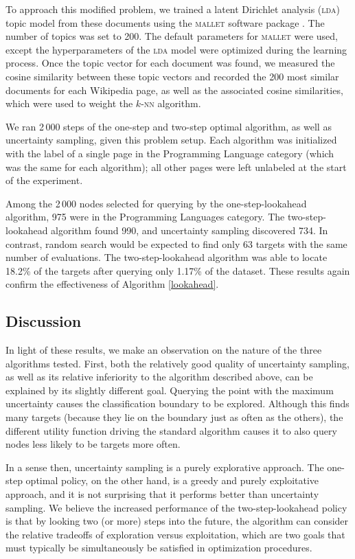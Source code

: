 \documentclass{article}
\begin{document}
To approach this modified problem, we trained a latent Dirichlet
analysis (\textsc{lda}) topic model from these documents using the
\textsc{mallet} software package \citep{mallet}. The number of topics
was set to 200.  The default parameters for \textsc{mallet} were used,
except the hyperparameters of the \textsc{lda} model were optimized
during the learning process.  Once the topic vector for each document
was found, we measured the cosine similarity between these topic
vectors and recorded the 200 most similar documents for each Wikipedia
page, as well as the associated cosine similarities, which were used
to weight the $k$-\textsc{nn} algorithm.

We ran 2\,000 steps of the one-step and two-step optimal algorithm, as
well as uncertainty sampling, given this problem setup. Each algorithm
was initialized with the label of a single page in the Programming
Language category (which was the same for each algorithm); all other
pages were left unlabeled at the start of the experiment.

Among the 2\,000 nodes selected for querying by the one-step-lookahead
algorithm, 975 were in the Programming Languages category.  The
two-step-lookahead algorithm found 990, and uncertainty sampling
discovered 734. In contrast, random search would be expected to find
only 63 targets with the same number of evaluations.  The
two-step-lookahead algorithm was able to locate 18.2\% of the targets
after querying only 1.17\% of the dataset.  These results again
confirm the effectiveness of Algorithm \ref{lookahead}.

\subsection{Discussion}

In light of these results, we make an observation on the nature of the
three algorithms tested.  First, both the relatively good quality of
uncertainty sampling, as well as its relative inferiority to the
algorithm described above, can be explained by its slightly different
goal.  Querying the point with the maximum uncertainty causes the
classification boundary to be explored.  Although this finds many
targets (because they lie on the boundary just as often as the
others), the different utility function driving the standard algorithm
causes it to also query nodes less likely to be targets more often.

In a sense then, uncertainty sampling is a purely explorative
approach.  The one-step optimal policy, on the other hand, is a greedy
and purely exploitative approach, and it is not surprising that it
performs better than uncertainty sampling.  We believe the increased
performance of the two-step-lookahead policy is that by looking two
(or more) steps into the future, the algorithm can consider the
relative tradeoffs of exploration versus exploitation, which are two
goals that must typically be simultaneously be satisfied in
optimization procedures.
\end{document}
